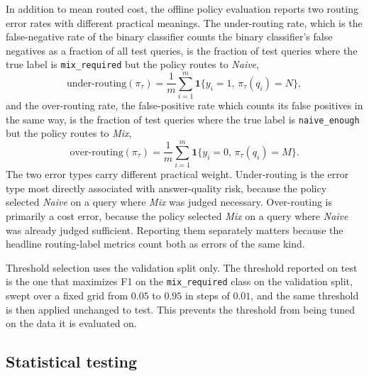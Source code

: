 \documentclass[english, bibtex]{kththesis}               %
\numberwithin{listing}{chapter}
\providecommand{\DIFaddtex}[1]{{\protect\color{blue} \sf #1}} %
\providecommand{\DIFdeltex}[1]{{\protect\color{red} \scriptsize #1}} %
\providecommand{\DIFaddbegin}{} %
\providecommand{\DIFaddend}{} %
\providecommand{\DIFdelbegin}{} %
\providecommand{\DIFdelend}{} %
\providecommand{\DIFadd}[1]{\texorpdfstring{\DIFaddtex{#1}}{#1}} %
\providecommand{\DIFdel}[1]{\texorpdfstring{\DIFdeltex{#1}}{}} %
\begin{document}
In addition to mean routed cost, the offline policy evaluation reports two routing error rates with different practical meanings. The under-routing rate, which \DIFdelbegin \DIFdel{is the false-negative rate of the binary classifier}\DIFdelend \DIFaddbegin \DIFadd{counts the binary classifier's false negatives as a fraction of all test queries}\DIFaddend , is the fraction of test queries where the true label is \texttt{mix\_required} but the policy routes to \emph{Naive},
\begin{equation}
\label{eq:underRouting}
\mathrm{under\text{-}routing}(\pi_\tau)
=
\frac{1}{m}
\sum_{i=1}^{m}
\mathbf{1}\{y_i = 1,\, \pi_\tau(q_i) = N\},
\end{equation}
and the over-routing rate, \DIFdelbegin \DIFdel{the false-positive rate}\DIFdelend \DIFaddbegin \DIFadd{which counts its false positives in the same way}\DIFaddend , is the fraction of test queries where the true label is \texttt{naive\_enough} but the policy routes to \emph{Mix},
\begin{equation}
\label{eq:overRouting}
\mathrm{over\text{-}routing}(\pi_\tau)
=
\frac{1}{m}
\sum_{i=1}^{m}
\mathbf{1}\{y_i = 0,\, \pi_\tau(q_i) = M\}.
\end{equation}
The two error types carry different practical weight. Under-routing is the error type most directly associated with answer-quality risk, because the policy selected \emph{Naive} on a query where \emph{Mix} was judged necessary. Over-routing is primarily a cost error, because the policy selected \emph{Mix} on a query where \emph{Naive} was already judged sufficient. Reporting them separately matters because the headline routing-label metrics count both as errors of the same kind.

Threshold selection uses the validation split only. The threshold reported on test is the one that maximizes F1 on the \texttt{mix\_required} class on the validation split, \DIFaddbegin \DIFadd{swept over a fixed grid from $0.05$ to $0.95$ in steps of $0.01$, }\DIFaddend and the same threshold is then applied unchanged to test. This prevents the threshold from being tuned on the data it is evaluated on.

\DIFdelbegin %
\DIFdelend \DIFaddbegin \subsection{Statistical testing}
\label{sec:methodStats}
\DIFaddend 
\end{document}
